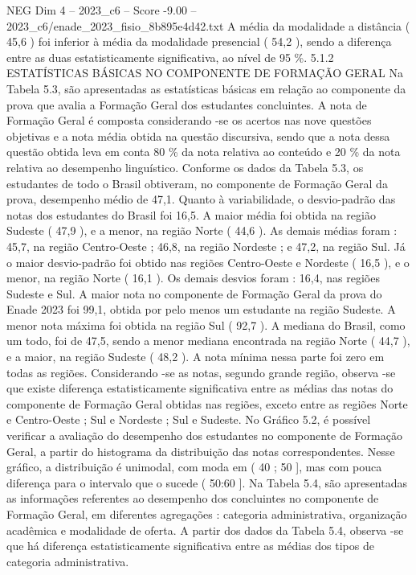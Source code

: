 \begin{textsample}{NEG Dim 4 – 2023\_c6 – Score -9.00 – 2023\_c6/enade\_2023\_fisio\_8b895e4d42.txt}
A média da modalidade a distância ( 45,6 ) foi inferior à média da modalidade presencial ( 54,2 ), sendo a diferença entre as duas estatisticamente significativa, ao nível de 95 \%. 5.1.2 ESTATÍSTICAS BÁSICAS NO COMPONENTE DE FORMAÇÃO GERAL Na Tabela 5.3, são apresentadas as estatísticas básicas em relação ao componente da prova que avalia a Formação Geral dos estudantes concluintes.
A nota de Formação Geral é composta considerando -se os acertos nas nove questões objetivas e a nota média obtida na questão discursiva, sendo que a nota dessa questão obtida leva em conta 80 \% da nota relativa ao conteúdo e 20 \% da nota relativa ao desempenho linguístico.
Conforme os dados da Tabela 5.3, os estudantes de todo o Brasil obtiveram, no componente de Formação Geral da prova, desempenho médio de 47,1.
Quanto à variabilidade, o desvio-padrão das notas dos estudantes do Brasil foi 16,5.
A maior média foi obtida na região Sudeste ( 47,9 ), e a menor, na região Norte ( 44,6 ).
As demais médias foram : 45,7, na região Centro-Oeste ; 46,8, na região Nordeste ; e 47,2, na região Sul.
Já o maior desvio-padrão foi obtido nas regiões Centro-Oeste e Nordeste ( 16,5 ), e o menor, na região Norte ( 16,1 ).
Os demais desvios foram : 16,4, nas regiões Sudeste e Sul.
A maior nota no componente de Formação Geral da prova do Enade 2023 foi 99,1, obtida por pelo menos um estudante na região Sudeste.
A menor nota máxima foi obtida na região Sul ( 92,7 ).
A mediana do Brasil, como um todo, foi de 47,5, sendo a menor mediana encontrada na região Norte ( 44,7 ), e a maior, na região Sudeste ( 48,2 ).
A nota mínima nessa parte foi zero em todas as regiões.
Considerando -se as notas, segundo grande região, observa -se que existe diferença estatisticamente significativa entre as médias das notas do componente de Formação Geral obtidas nas regiões, exceto entre as regiões Norte e Centro-Oeste ; Sul e Nordeste ; Sul e Sudeste.
No Gráfico 5.2, é possível verificar a avaliação do desempenho dos estudantes no componente de Formação Geral, a partir do histograma da distribuição das notas correspondentes.
Nesse gráfico, a distribuição é unimodal, com moda em ( 40 ; 50 ], mas com pouca diferença para o intervalo que o sucede ( 50:60 ].
Na Tabela 5.4, são apresentadas as informações referentes ao desempenho dos concluintes no componente de Formação Geral, em diferentes agregações : categoria administrativa, organização acadêmica e modalidade de oferta.
A partir dos dados da Tabela 5.4, observa -se que há diferença estatisticamente significativa entre as médias dos tipos de categoria administrativa.

\end{textsample}

